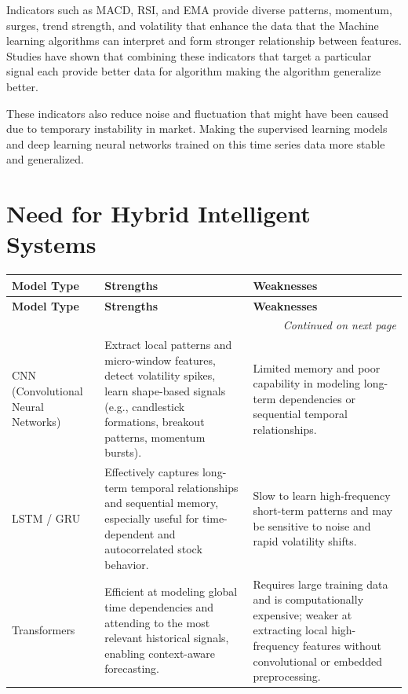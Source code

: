 Indicators such as MACD, RSI, and EMA provide diverse patterns, momentum, surges, trend strength, and volatility that enhance the data that the Machine learning algorithms can interpret and form stronger relationship between features. Studies have shown that combining these indicators that target a particular signal each provide better data for algorithm making the algorithm generalize better.

These indicators also reduce noise and fluctuation that might have been caused due to temporary instability in market. Making the supervised learning models and deep learning neural networks trained on this time series data more stable and generalized.

\section{Need for Hybrid Intelligent Systems}

\begin{longtable}{|p{2.5cm}|p{5.5cm}|p{5.5cm}|}
\hline
\textbf{Model Type} & \textbf{Strengths} & \textbf{Weaknesses} \\
\hline
\endfirsthead

\hline
\textbf{Model Type} & \textbf{Strengths} & \textbf{Weaknesses} \\
\hline
\endhead

\hline
\multicolumn{3}{r}{\textit{Continued on next page}} \\
\endfoot

\hline
\endlastfoot

CNN (Convolutional Neural Networks) &
Extract local patterns and micro-window features, detect volatility spikes, learn shape-based signals (e.g., candlestick formations, breakout patterns, momentum bursts). &
Limited memory and poor capability in modeling long-term dependencies or sequential temporal relationships. \\
\hline

LSTM / GRU &
Effectively captures long-term temporal relationships and sequential memory, especially useful for time-dependent and autocorrelated stock behavior. &
Slow to learn high-frequency short-term patterns and may be sensitive to noise and rapid volatility shifts. \\
\hline

Transformers &
Efficient at modeling global time dependencies and attending to the most relevant historical signals, enabling context-aware forecasting. &
Requires large training data and is computationally expensive; weaker at extracting local high-frequency features without convolutional or embedded preprocessing. \\
\hline

\end{longtable}

